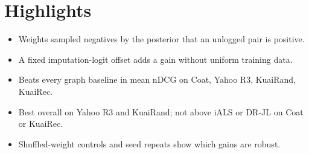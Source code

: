 \documentclass[12pt]{article}
\begin{document}
\section*{Highlights}
\begin{itemize}
\item Weights sampled negatives by the posterior that an unlogged pair is positive.
\item A fixed imputation-logit offset adds a gain without uniform training data.
\item Beats every graph baseline in mean nDCG on Coat, Yahoo R3, KuaiRand, KuaiRec.
\item Best overall on Yahoo R3 and KuaiRand; not above iALS or DR-JL on Coat or KuaiRec.
\item Shuffled-weight controls and seed repeats show which gains are robust.
\end{itemize}
\end{document}
